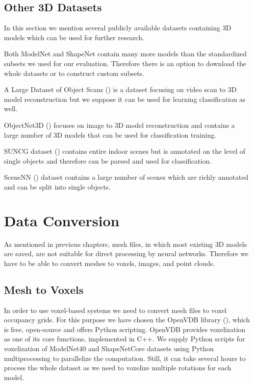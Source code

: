 \subsection{Other 3D Datasets}
In this section we mention several publicly available datasets containing 3D models which can be used for further research. \par
Both ModelNet and ShapeNet contain many more models than the standardized subsets we used for our evaluation. Therefore there is an option to download the whole datasets or to construct custom subsets. \par
A Large Dataset of Object Scans (\cite{choi_large_2016}) is a dataset focusing on video scan to 3D model reconstruction but we suppose it can be used for learning classification as well.  \par
ObjectNet3D (\cite{xiang_objectnet3d:_2016}) focuses on image to 3D model reconstruction and contains a large number of 3D models that can be used for classification training.\par
SUNCG dataset (\cite{song_semantic_2017}) contains entire indoor scenes but is annotated on the level of single objects and therefore can be parsed and used for classification. \par
SceneNN (\cite{hua_scenenn:_2016}) dataset contains a large number of scenes which are richly annotated and can be split into single objects.

\section{Data Conversion}
As mentioned in previous chapters,  mesh files, in which most existing 3D models are saved, are not suitable for direct processing by neural networks. Therefore we have to be able to convert meshes to voxels, images, and point clouds.

\subsection{Mesh to Voxels}
In order to use voxel-based systems we need to convert mesh files to voxel occupancy grids. For this purpose we have chosen the OpenVDB library (\cite{museth_openvdb:_2013}), which is free, open-source and offers Python scripting. OpenVDB provides voxelization as one of its core functions, implemented in C++. We supply Python scripts for voxelization of ModelNet40 and ShapeNetCore datasets using Python multiprocessing to parallelize the computation. Still, it can take several hours to process the whole dataset as we need to voxelize multiple rotations for each model. 

